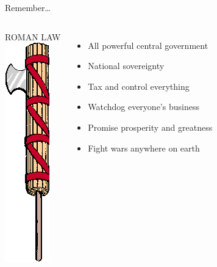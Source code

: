 \begin{frame}{Remember\ldots}
    \begin{columns}[onlytextwidth]
            \centering
            \huge{ROMAN LAW} \\
            \vspace{20pt}
            \includegraphics[height=0.55\textheight]{img/fasces.png} \\

            \begin{itemize}
                \item All powerful central government
                \item National sovereignty
                \item Tax and control everything
                \item Watchdog everyone's business
                \item Promise prosperity and greatness
                \item Fight wars anywhere on earth
            \end{itemize}
    \end{columns}
\end{frame}

